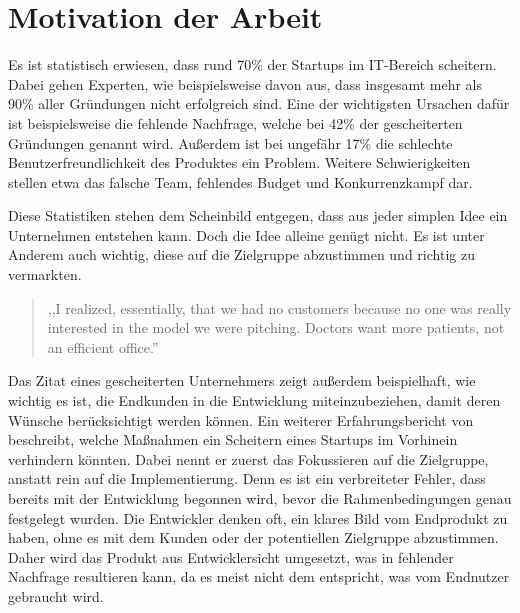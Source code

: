 \section{Motivation der Arbeit}
Es ist statistisch erwiesen, dass rund 70\% der Startups im IT-Bereich scheitern.  \cite{CBInsights_failure} Dabei gehen Experten, wie beispielsweise  davon aus, dass insgesamt mehr als 90\% aller Gründungen nicht erfolgreich sind. Eine der wichtigsten Ursachen dafür ist beispielsweise die fehlende Nachfrage, welche bei 42\% der gescheiterten Gründungen genannt wird. Außerdem ist bei ungefähr 17\% die schlechte Benutzerfreundlichkeit des Produktes ein Problem. Weitere Schwierigkeiten stellen etwa das falsche Team, fehlendes Budget und Konkurrenzkampf dar. \cite{CBInsights_reasons} 

Diese Statistiken stehen dem Scheinbild entgegen, dass aus jeder simplen Idee ein Unternehmen entstehen kann. Doch die Idee alleine genügt nicht. Es ist unter Anderem auch wichtig, diese auf die Zielgruppe abzustimmen und richtig zu vermarkten. 
\begin{quote}
,,I realized, essentially, that we had no customers because no one was really interested in the model we were pitching. Doctors want more patients, not an efficient office.'' \cite{CBInsights_reasons}
\end{quote}
Das Zitat eines gescheiterten Unternehmers zeigt außerdem beispielhaft, wie wichtig es ist, die Endkunden in die Entwicklung miteinzubeziehen, damit deren Wünsche berücksichtigt werden können. Ein weiterer Erfahrungsbericht von  beschreibt, welche Maßnahmen ein Scheitern eines Startups im Vorhinein verhindern könnten. Dabei nennt er zuerst das Fokussieren auf die Zielgruppe, anstatt rein auf die Implementierung. Denn es ist ein verbreiteter Fehler, dass bereits mit der Entwicklung begonnen wird, bevor die Rahmenbedingungen genau festgelegt wurden. Die Entwickler denken oft, ein klares Bild vom Endprodukt zu haben, ohne es mit dem Kunden oder der potentiellen Zielgruppe abzustimmen. Daher wird das Produkt aus Entwicklersicht umgesetzt, was in fehlender Nachfrage resultieren kann, da es meist nicht dem entspricht, was vom Endnutzer gebraucht wird.

